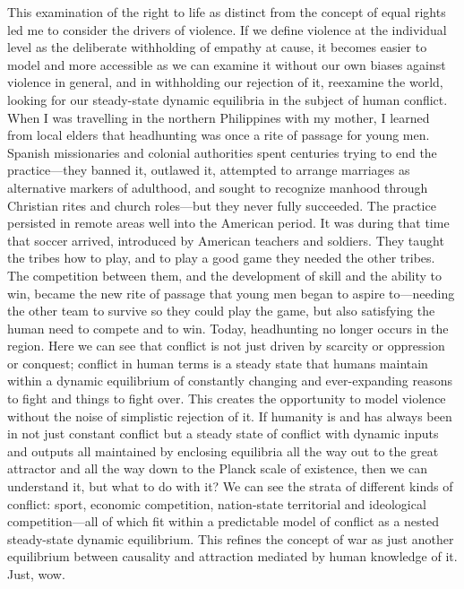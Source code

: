 This examination of the right to life as distinct from the concept of equal rights led me to consider the drivers of violence. If we define violence at the individual level as the deliberate withholding of empathy at cause, it becomes easier to model and more accessible as we can examine it without our own biases against violence in general, and in withholding our rejection of it, reexamine the world, looking for our steady-state dynamic equilibria in the subject of human conflict. When I was travelling in the northern Philippines with my mother, I learned from local elders that headhunting was once a rite of passage for young men. Spanish missionaries and colonial authorities spent centuries trying to end the practice—they banned it, outlawed it, attempted to arrange marriages as alternative markers of adulthood, and sought to recognize manhood through Christian rites and church roles—but they never fully succeeded. The practice persisted in remote areas well into the American period. It was during that time that soccer arrived, introduced by American teachers and soldiers. They taught the tribes how to play, and to play a good game they needed the other tribes. The competition between them, and the development of skill and the ability to win, became the new rite of passage that young men began to aspire to—needing the other team to survive so they could play the game, but also satisfying the human need to compete and to win. Today, headhunting no longer occurs in the region. Here we can see that conflict is not just driven by scarcity or oppression or conquest; conflict in human terms is a steady state that humans maintain within a dynamic equilibrium of constantly changing and ever-expanding reasons to fight and things to fight over. This creates the opportunity to model violence without the noise of simplistic rejection of it. If humanity is and has always been in not just constant conflict but a steady state of conflict with dynamic inputs and outputs all maintained by enclosing equilibria all the way out to the great attractor and all the way down to the Planck scale of existence, then we can understand it, but what to do with it? We can see the strata of different kinds of conflict: sport, economic competition, nation-state territorial and ideological competition—all of which fit within a predictable model of conflict as a nested steady-state dynamic equilibrium. This refines the concept of war as just another equilibrium between causality and attraction mediated by human knowledge of it. Just, wow.

